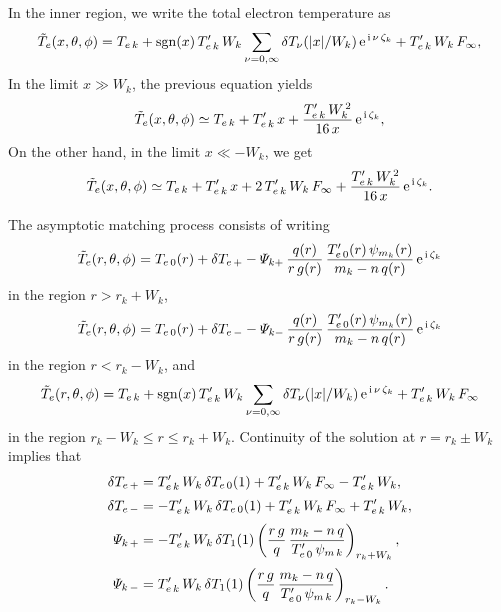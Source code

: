 \documentclass[12pt,prb,aps,notitlepage]{revtex4-1}
\begin{document}
In the inner region, we write the total electron temperature as 
\begin{equation}
\tilde{T}_e(x, \theta,\phi)=T_{e\,k} +{\rm sgn}(x)\,T_{e\,k}'\,W_k\sum_{\nu=0,\infty}\delta T_\nu(|x|/W_k)\,{\rm e}^{\,{\rm i}\,\nu\,\zeta_k}+T_{e\,k}'\,W_k\,F_\infty,
\end{equation}
In the limit $x\gg W_k$, the previous equation yields 
\begin{equation}
\tilde{T}_e(x,\theta,\phi) \simeq T_{e\,k} + T_{e\,k}'\,x + \frac{T_{e\,k}'\,W_k^{\,2}}{16\,x}\,{\rm e}^{\,{\rm i}\,\zeta_k},
\end{equation}
On the other hand, in the limit $x\ll -W_k$, we get 
\begin{equation}
\tilde{T}_e(x,\theta,\phi) \simeq T_{e\,k} + T_{e\,k}'\,x  + 2\,T_{e\,k}'\,W_k\,F_\infty + \frac{T_{e\,k}'\,W_k^{\,2}}{16\,x}\,{\rm e}^{\,{\rm i}\,\zeta_k}.
\end{equation}

The asymptotic matching process consists of writing
\begin{equation}
\tilde{T}_e(r,\theta,\phi) = T_{e\,0}(r) + \delta T_{e\,+} - {\mit\Psi}_{k+}\,\frac{q(r)}{r\,g(r)}\,\frac{T_{e\,0}'(r)\,\psi_{m_k}(r)}{m_k-n\,q(r)}\,{\rm e}^{\,{\rm i}\,\zeta_k}
\end{equation}
in the region $r>r_k+W_k$, 
\begin{equation}
\tilde{T}_e(r,\theta,\phi) = T_{e\,0}(r) + \delta T_{e\,-} - {\mit\Psi}_{k-}\,\frac{q(r)}{r\,g(r)}\,\frac{T_{e\,0}'(r)\,\psi_{m_k}(r)}{m_k-n\,q(r)}\,{\rm e}^{\,{\rm i}\,\zeta_k}
\end{equation}
in the region $r< r_k-W_k$, and 
\begin{equation}
\tilde{T}_e(r, \theta,\phi)=T_{e\,k} +{\rm sgn}(x)\,T_{e\,k}'\,W_k\sum_{\nu=0,\infty}\delta T_\nu(|x|/W_k)\,{\rm e}^{\,{\rm i}\,\nu\,\zeta_k}+T_{e\,k}'\,W_k\,F_\infty
\end{equation}
in the region $r_k-W_k \leq r\leq r_k+W_k$. Continuity of the solution at $r=r_k\pm W_k$ implies that
\begin{align}
\delta T_{e\,+} &= T_{e\,k}'\,W_k\,\delta T_{e\,0}(1)+T_{e\,k}'\,W_k\,F_\infty - T_{e\,k}'\,W_k,\\[0.5ex]
\delta T_{e\,-} &= - T_{e\,k}'\,W_k\,\delta T_{e\,0}(1) +T_{e\,k}'\,W_k\,F_\infty+ T_{e\,k}'\,W_k,\\[0.5ex]
{\mit\Psi}_{k\,+} &= - T_{e\,k}'\,W_k\,\delta T_1(1)\left(\frac{r\,g}{q}\,\frac{m_k-n\,q}{T_{e\,0}'\,\psi_{m\,k}}\right)_{r_k+W_k},\\[0.5ex]
{\mit\Psi}_{k\,-} &= T_{e\,k}'\,W_k\,\delta T_1(1)\left(\frac{r\,g}{q}\,\frac{m_k-n\,q}{T_{e\,0}'\,\psi_{m\,k}}\right)_{r_k-W_k}.
\end{align}
\end{document}

